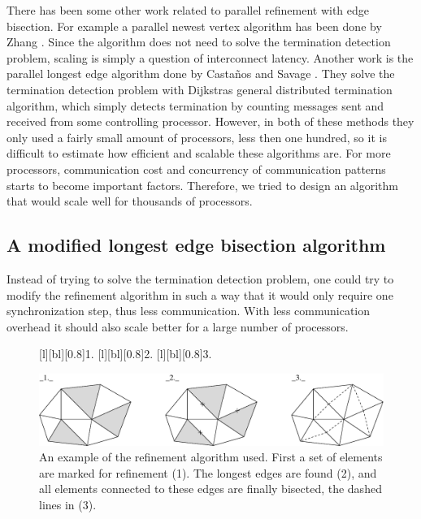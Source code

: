 There has been some other work related to parallel refinement with
edge bisection. For example a parallel newest vertex algorithm has
been done by Zhang \cite{Zhang2005}. Since the algorithm does not need
to solve the termination detection problem, scaling is simply a
question of interconnect latency. Another work is the parallel longest
edge algorithm done by Casta\~nos and Savage \cite{CastanosSavage1999}. They
solve the termination detection problem with Dijkstras general
distributed termination algorithm, which simply detects termination by
counting messages sent and received from some controlling
processor. However, in both of these methods they only used a fairly
small amount of processors, less then one hundred, so it is difficult
to estimate how efficient and scalable these algorithms are. For more
processors, communication cost and concurrency of communication
patterns starts to become important factors. Therefore, we tried to
design an algorithm that would scale well for thousands of processors.



\subsection{A modified longest edge bisection algorithm}
\label{hoffman-4:sect:modlong}

Instead of trying to solve the termination detection problem, one
could try to modify the refinement algorithm in such a way that it
would only require one synchronization step, thus less
communication. With less communication overhead it should also scale
better for a large number of processors.

\begin{figure}[htb]
 [l][bl][0.8]{1.}  [l][bl][0.8]{2.}
 [l][bl][0.8]{3.}  \begin{center}
 \includegraphics[width=1.0\columnwidth]{chapters/hoffman-4/eps/mref.eps}
 \end{center} \caption{An example of the refinement algorithm
 used. First a set of elements are marked for refinement (1). The
 longest edges are found (2), and all elements connected to these
 edges are finally bisected, the dashed lines in (3).}
 \label{hoffman-4:fig:bisectexample}
\end{figure}

